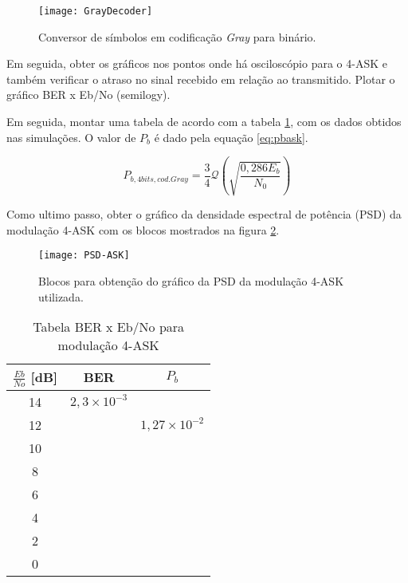 \begin{figure}[H]
    \centering
    \texttt{[image: GrayDecoder]}
    \caption{Conversor de símbolos em codificação \textit{Gray} para binário.}
    \label{fig:GrayDecoder}
\end{figure}

Em seguida, obter os gráficos nos pontos onde há osciloscópio  para o 4-ASK e também verificar o atraso no sinal recebido em relação ao transmitido. Plotar o gráfico BER x Eb/No (semilogy). 

Em seguida, montar uma tabela de acordo com a tabela \ref{tab:1}, com os dados obtidos nas simulações. O valor de $P_b$ é dado pela equação \ref{eq:pbask}.

\begin{equation}
\label{eq:pbask}
P_{b,4 bits, cod. Gray} = \frac{3}{4}\mathcal{Q}\left(\sqrt{\frac{0,286E_b}{N_0}} \right)
\end{equation}

Como ultimo passo, obter o gráfico da densidade espectral de potência (PSD) da modulação 4-ASK com os blocos mostrados na figura \ref{fig:PSD-ASK}.

\begin{figure}[H]
    \centering
    \texttt{[image: PSD-ASK]}
    \caption{Blocos para obtenção do gráfico da PSD da modulação 4-ASK utilizada.}
    \label{fig:PSD-ASK}
\end{figure}

\begin{small}
    \begin{table}[H]
        \begin{center}
            \caption{Tabela BER x Eb/No para modulação 4-ASK}
            \begin{tabular}{c|c|c}
                \hline
                $\frac{Eb}{No}$ [dB] & BER & $P_b$ \\
                \hline
                14 & $2,3 \times 10^{-3} $ & \\
                \hline
                12 & & $1,27 \times 10^{-2} $\\
                \hline
                10 & & \\
                \hline
                8 & & \\
                \hline
                6 & & \\
                \hline
                4 & & \\
                \hline
                2 & & \\
                \hline
                0 & & \\
                \hline
            \end{tabular}
            \label{tab:1}
        \end{center}
    \end{table}
\end{small}


